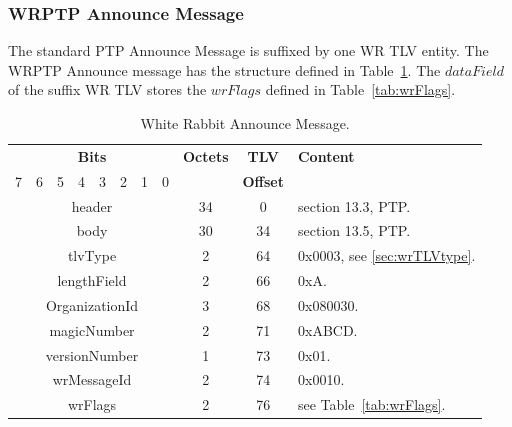 \documentclass[a4paper, 12pt]{article}
\begin{document}
\newpage

\subsubsection{WRPTP Announce Message}
\label{sec:wrAnnounceMSG}


The standard PTP Announce Message is suffixed by one WR TLV entity. 
The WRPTP Announce message has the structure defined in Table~\ref{tab:wrAnnounce}. The $dataField$
of the suffix WR TLV stores the $wrFlags$ defined in Table~\ref{tab:wrFlags}.

\begin{table}[ht!]
\caption{White Rabbit Announce Message.}
\centering
\begin{tabular}{| c | c | c | c | c | c | c | c | c | c | p{4.5cm} |}
\hline
\multicolumn{8}{|c|}{\textbf{Bits}} & \textbf{Octets} & \textbf{TLV}  & \textbf{Content} \\
\cline{0-7}
7 & 6 & 5 & 4 & 3 & 2 & 1 & 0 &     & \textbf{Offset}  &  \\
\hline
\multicolumn{8}{|c|}{header        }  & 34 & 0  & section 13.3, PTP. \\ \hline
\multicolumn{8}{|c|}{body          }  & 30 & 34 & section 13.5, PTP.         \\ \hline
\multicolumn{8}{|c|}{tlvType       }  & 2  & 64 & 0x0003, see \ref{sec:wrTLVtype}. \\ \hline
\multicolumn{8}{|c|}{lengthField   }  & 2  & 66 & 0xA.   \\ \hline
\multicolumn{8}{|c|}{OrganizationId}  & 3  & 68 & 0x080030.               \\ \hline
\multicolumn{8}{|c|}{magicNumber   }  & 2  & 71 & 0xABCD.               \\ \hline
\multicolumn{8}{|c|}{versionNumber }  & 1  & 73 & 0x01.               \\ \hline
\multicolumn{8}{|c|}{wrMessageId   }  & 2  & 74 & 0x0010.               \\ \hline
\multicolumn{8}{|c|}{wrFlags       }  & 2  & 76 & see Table~\ref{tab:wrFlags}.    \\ \hline
\end{tabular}
\label{tab:wrAnnounce}
\end{table}
\end{document}
